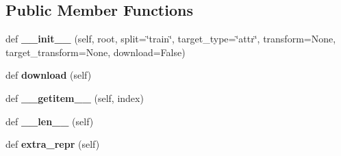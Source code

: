 \subsection*{Public Member Functions}
\begin{DoxyCompactItemize}
\item 
\mbox{\label{classtorchvision_1_1datasets_1_1celeba_1_1CelebA_ac6994580c83c175300f1b03b0d7b6550}} 
def {\bfseries \+\_\+\+\_\+init\+\_\+\+\_\+} (self, root, split=\char`\"{}train\char`\"{}, target\+\_\+type=\char`\"{}attr\char`\"{}, transform=None, target\+\_\+transform=None, download=False)
\item 
\mbox{\label{classtorchvision_1_1datasets_1_1celeba_1_1CelebA_a6fcff43eb95507f41ed7c515f6d7fe5c}} 
def {\bfseries download} (self)
\item 
\mbox{\label{classtorchvision_1_1datasets_1_1celeba_1_1CelebA_a455a3fab9dcec32901013ee1748a3abd}} 
def {\bfseries \+\_\+\+\_\+getitem\+\_\+\+\_\+} (self, index)
\item 
\mbox{\label{classtorchvision_1_1datasets_1_1celeba_1_1CelebA_adc4250fef5b7154f8fe71b0f92c60c3a}} 
def {\bfseries \+\_\+\+\_\+len\+\_\+\+\_\+} (self)
\item 
\mbox{\label{classtorchvision_1_1datasets_1_1celeba_1_1CelebA_ac5824d26b955fa1b5c81ab67fb8c4648}} 
def {\bfseries extra\+\_\+repr} (self)
\end{DoxyCompactItemize}
